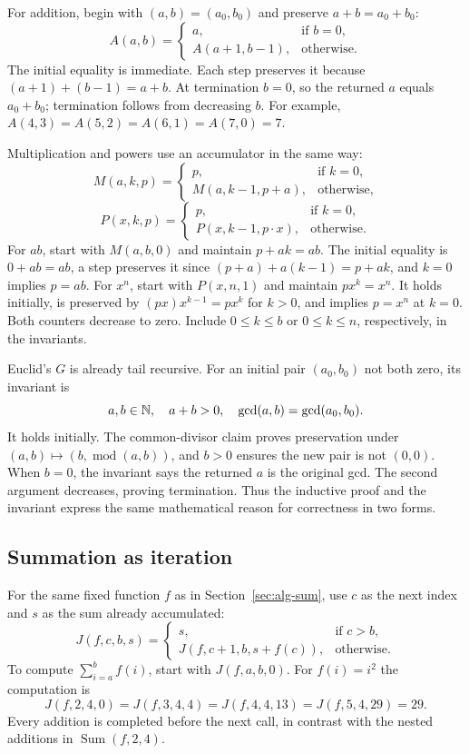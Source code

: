 For addition, begin with $(a,b)=(a_0,b_0)$ and preserve $a+b=a_0+b_0$:
\[
A(a,b)=\begin{cases}
a,&\text{if }b=0,\\
A(a+1,b-1),&\text{otherwise}.
\end{cases}
\]
The initial equality is immediate. Each step preserves it because
$(a+1)+(b-1)=a+b$. At termination $b=0$, so the returned $a$ equals
$a_0+b_0$; termination follows from decreasing $b$.
For example, $A(4,3)=A(5,2)=A(6,1)=A(7,0)=7$.

Multiplication and powers use an accumulator in the same way:
\[
M(a,k,p)=\begin{cases}
p,&\text{if }k=0,\\
M(a,k-1,p+a),&\text{otherwise},
\end{cases}
\]
\[
P(x,k,p)=\begin{cases}
p,&\text{if }k=0,\\
P(x,k-1,p\cdot x),&\text{otherwise}.
\end{cases}
\]
For $ab$, start with $M(a,b,0)$ and maintain $p+ak=ab$.
The initial equality is $0+ab=ab$, a step preserves it since
$(p+a)+a(k-1)=p+ak$, and $k=0$ implies $p=ab$.
For $x^n$, start with $P(x,n,1)$ and maintain $px^k=x^n$.
It holds initially, is preserved by $(px)x^{k-1}=px^k$ for $k>0$, and
implies $p=x^n$ at $k=0$. Both counters decrease to zero. Include
$0\leq k\leq b$ or $0\leq k\leq n$, respectively, in the invariants.

Euclid's $G$ is already tail recursive. For an initial pair $(a_0,b_0)$
not both zero, its invariant is
\[
a,b\in\mathbb{N},\quad a+b>0,\quad \gcd(a,b)=\gcd(a_0,b_0).
\]
It holds initially. The common-divisor claim proves preservation under
$(a,b)\mapsto(b,\operatorname{mod}(a,b))$, and $b>0$ ensures the new pair
is not $(0,0)$. When $b=0$, the invariant says the returned $a$ is the
original gcd. The second argument decreases, proving termination. Thus the
inductive proof and the invariant express the same mathematical reason for
correctness in two forms.

\subsection{Summation as iteration}
\label{sec:alg-sum-iteration}

For the same fixed function $f$ as in Section~\ref{sec:alg-sum}, use $c$ as
the next index and $s$ as the sum already accumulated:
\[
J(f,c,b,s)=\begin{cases}
s,&\text{if }c>b,\\
J(f,c+1,b,s+f(c)),&\text{otherwise}.
\end{cases}
\]
To compute $\sum_{i=a}^{b}f(i)$, start with $J(f,a,b,0)$.
For $f(i)=i^2$ the computation is
\[
J(f,2,4,0)=J(f,3,4,4)=J(f,4,4,13)=J(f,5,4,29)=29.
\]
Every addition is completed before the next call, in contrast with the
nested additions in $\operatorname{Sum}(f,2,4)$.

